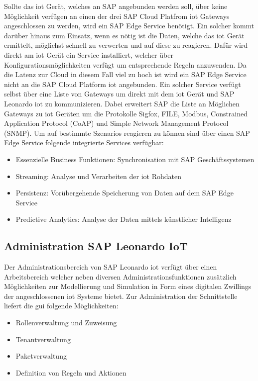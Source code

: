 \noindent Sollte das \ac{iot} Gerät, welches an SAP angebunden werden soll, über keine Möglichkeit verfügen an einen der drei SAP Cloud Platfrom \ac{iot} Gateways angeschlossen zu werden, wird ein SAP Edge Service benötigt. Ein solcher kommt darüber hinaus zum Einsatz, wenn es nötig ist die Daten, welche das \ac{iot} Gerät ermittelt, möglichst schnell zu verwerten und auf diese zu reagieren. Dafür wird direkt am \ac{iot} Gerät ein Service installiert, welcher über Konfigurationsmöglichkeiten verfügt um entsprechende Regeln anzuwenden. Da die Latenz zur Cloud in diesem Fall viel zu hoch ist wird ein SAP Edge Service nicht an die SAP Cloud Platform \ac{iot} angebunden. Ein solcher Service verfügt selbst über eine Liste von Gateways um direkt mit dem \ac{iot} Gerät und SAP Leonardo \ac{iot} zu kommunizieren. Dabei erweitert SAP die Liste an Möglichen Gateways zu \ac{iot} Geräten um die Protokolle Sigfox, FILE, Modbus, Constrained Application Protocol (CoAP) und Simple Network Management Protocol (SNMP). Um auf bestimmte Szenarios reagieren zu können sind über einen SAP Edge Service folgende integrierte Services verfügbar\cite[Seite 229ff]{Holtschulte20:IOS}:
\begin{itemize}
	\item{Essenzielle Business Funktionen: Synchronisation mit SAP Geschäftssystemen}
	\item{Streaming: Analyse und Verarbeiten der \ac{iot} Rohdaten}
	\item{Persistenz: Vorübergehende Speicherung von Daten auf dem SAP Edge Service}
	\item{Predictive Analytics: Analyse der Daten mittels künstlicher Intelligenz}
\end{itemize}   

\subsection{Administration SAP Leonardo IoT}
\label{ss:interface:admin}

\noindent Der Administrationsbereich von SAP Leonardo \ac{iot} verfügt über einen Arbeitsbereich welcher neben diversen Administrationsfunktionen zusätzlich Möglichkeiten zur Modellierung und Simulation in Form eines digitalen Zwillings der angeschlossenen \ac{iot} Systeme bietet. Zur Administration der Schnittstelle liefert die \ac{gui} folgende Möglichkeiten:
\begin{itemize}
	\item{Rollenverwaltung und Zuweisung}
	\item{Tenantverwaltung}
	\item{Paketverwaltung}
	\item{Definition von Regeln und Aktionen}
\end{itemize}

